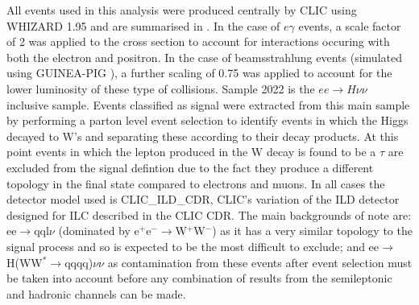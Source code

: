 All events used in this analysis were produced centrally by \ac{CLIC} using WHIZARD 1.95 \cite{Kilian:2007gr} and are summarised in . In the case of $e\gamma$ events, a scale factor of 2 was applied to the cross section to account for interactions occuring with both the electron and positron. In the case of beamsstrahlung events (simulated using GUINEA-PIG \cite{Schulte:382453}), a further scaling of 0.75 was applied to account for the lower luminosity of these type of collisions. Sample 2022 is the $ee\rightarrow H\nu\nu$ inclusive sample. Events classified as signal were extracted from this main sample by performing a parton level event selection to identify events in which the Higgs decayed to W's and separating these according to their decay products. At this point events in which the lepton produced in the W decay is found to be a $\tau$ are excluded from the signal defintion due to the fact they produce a different topology in the final state compared to electrons and muons. In all cases the detector model used is CLIC\_ILD\_CDR, CLIC's variation of the ILD detector designed for ILC described in the \ac{CLIC} CDR\cite{CDR}. The main backgrounds of note are: ee$\rightarrow$qql$\nu$ (dominated by e$^+$e$^-\rightarrow$W$^+$W$^-$) as it has a very similar topology to the signal process and so is expected to be the most difficult to exclude; and ee$\rightarrow$ H(WW$^*\rightarrow$qqqq)$\nu\nu$ as contamination from these events after event selection must be taken into account before any combination of results from the semileptonic and hadronic channels can be made.


